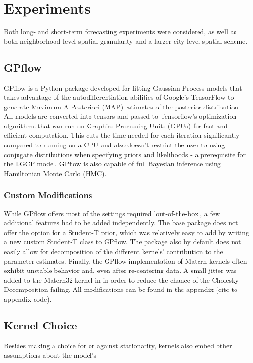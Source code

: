 
\section{Experiments}
\label{experiments}

Both long- and short-term forecasting experiments were considered, as well as both neighborhood level spatial granularity and a larger city level spatial scheme.



\subsection{GPflow}

GPflow is a Python package developed for fitting Gaussian Process models that takes advantage of the autodifferentiation abilities of Google's TensorFlow to generate Maximum-A-Posteriori (MAP) estimates of the posterior distribution \cite{GPflow2017} \cite{tensorflow2015-whitepaper}. All models are converted into tensors and passed to Tensorflow's optimization algorithms that can run on Graphics Processing Units (GPUs) for fast and efficient computation. This cuts the time needed for each iteration significantly compared to running on a CPU and also doesn't restrict the user to using conjugate distributions when specifying priors and likelihoods - a prerequisite for the LGCP model. GPflow is also capable of full Bayesian inference using Hamiltonian Monte Carlo (HMC).

\subsubsection{Custom Modifications}

While GPflow offers most of the settings required 'out-of-the-box', a few additional features had to be added independently. The base package does not offer the option for a Student-T prior, which was relatively easy to add by writing a new custom Student-T class to GPflow. The package also by default does not easily allow for decomposition of the different kernels' contribution to the parameter estimates. Finally, the GPflow implementation of Matern kernels often exhibit unstable behavior and, even after re-centering data. A small jitter was added to the Matern32 kernel in in order to reduce the chance of the Cholesky Decomposition failing. All modifications can be found in the appendix \todo(cite to appendix code).

\subsection{Kernel Choice}

Besides making a choice for or against stationarity, kernels also embed other assumptions about the model's

